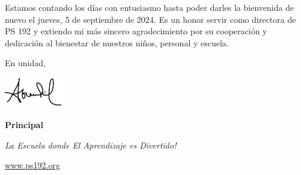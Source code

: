 \documentclass[letterpaper, 12pt]{article}
\begin{document}
Estamos contando los días con entusiasmo hasta poder darles la bienvenida de nuevo el jueves, 5 de septiembre de 2024. Es un honor servir como directora de PS 192 y extiendo mi más sincero agradecimiento por su cooperación y dedicación al bienestar de nuestros niños, personal y escuela.

En unidad,

\includegraphics[width=0.2\textwidth]{hil_signature}

\textbf{Principal}

\textit{La Escuela donde El Aprendizaje es Divertido!}

\href{https://www.ps192.org}{www.ps192.org}
\end{document}
